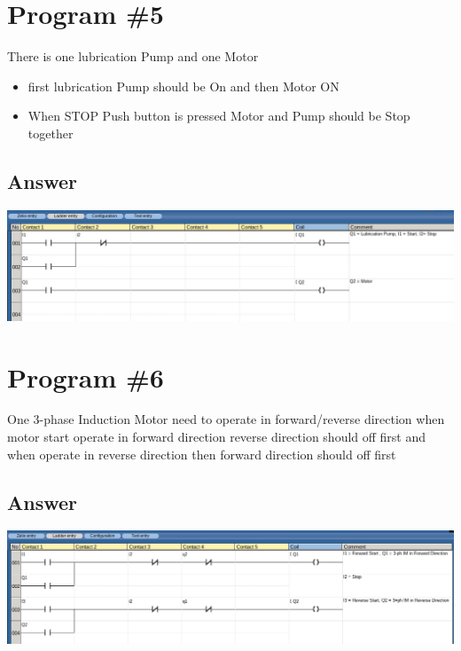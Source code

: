 \documentclass[
	12pt, %
]{fphw}
\begin{document}
\section*{Program \#5}
 \begin{problem}
   There is one lubrication Pump and one Motor
 \medskip
 \begin{itemize}%
  \item first lubrication Pump should be On and then Motor ON
  \item When STOP Push button is pressed Motor and Pump should be Stop together
  \end{itemize}
\end{problem}
\subsection*{Answer}
\begin{center}
  \includegraphics[width=165mm, scale=0.80]{prg5.png}
\end{center}

\section*{Program \#6}                                                           
\begin{problem}                                                           One
  3-phase Induction Motor need to operate in forward/reverse direction when
  motor start operate in forward direction reverse direction should off first
  and when operate in reverse direction then forward direction should off first                                
  \medskip
\end{problem}
\subsection*{Answer}
 \begin{center}
   \includegraphics[width=165mm, scale=0.80]{prg6.png}
 \end{center}
\end{document}
